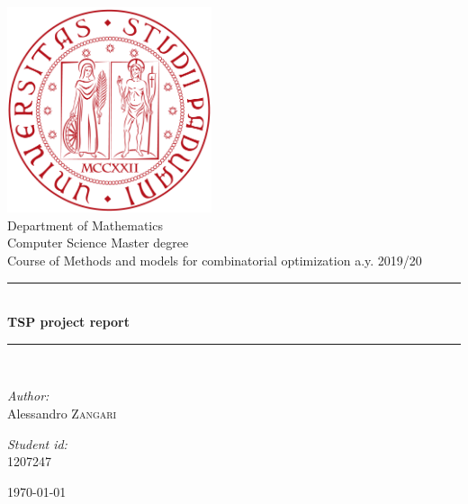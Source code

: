 \documentclass[a4paper,12pt]{article}
\theoremstyle{break}
\begin{document}

\begin{titlepage}
\begin{center}
	

\includegraphics[width=0.45\textwidth]{logo-unipd}\\[1cm]

{\large Department of Mathematics}\\[0.5cm]

{\large Computer Science Master degree}\\[0.5cm]

{\large Course of Methods and models for combinatorial optimization a.y. 2019/20}\\[0.5cm]


\rule{\linewidth}{0.5mm} \\[0.4cm]
{ \huge \bfseries TSP project report \\[0.4cm] }
\rule{\linewidth}{0.5mm} \\[1.5cm]

\noindent
\begin{minipage}{0.4\textwidth}
  \begin{flushleft} \large
    \emph{Author:}\\
    Alessandro \textsc{Zangari}
  \end{flushleft}
\end{minipage}%
\begin{minipage}{0.4\textwidth}
  \begin{flushright} \large
    \emph{Student id:} \\
    \textsc{1207247}
  \end{flushright}
\end{minipage}

\vfill

{\today}

\end{center}
\end{titlepage}
\end{document}
